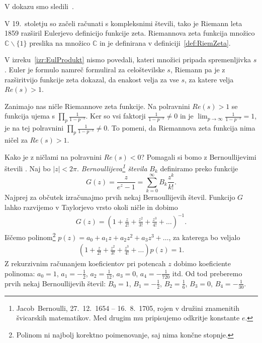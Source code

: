 \documentclass[mat1]{fmfdelo}
\begin{document}
V dokazu smo sledili~\cite{riemannHyp}.

V 19.~stoletju so začeli računati s kompleksnimi števili, tako je Riemann leta 1859 razširil Eulerjevo definicijo funkcije zeta. Riemannova zeta funkcija množico  $\mathbb{C}\backslash\{1\}$ preslika na množico  $\mathbb{C}$ in je definirana v definiciji~\ref{def:RiemZeta}.

\begin{opomba}
V izreku~\ref{izr:EulProdukt} nismo povedali, kateri množici pripada spremenljivka $s$. Euler je formulo namreč formuliral za celoštevilske $s$, Riemann pa je z razširitvijo funkcije zeta dokazal, da enakost velja za vse $s$, za katere velja $Re(s)>1$.
\end{opomba}

Zanimajo nas ničle Riemannove zeta funkcije. Na polravnini $Re(s)>1$ se funkcija ujema s $\prod_{p}\frac{1}{1-p^{-s}}$. Ker so vsi faktorji $\frac{1}{1-p^{-s}} \neq 0$ in je $\lim_{p\to\infty} \frac{1}{1-p^{-s}} = 1$, je na tej polravnini $\prod_{p}\frac{1}{1-p^{-s}} \neq 0$. To pomeni, da Riemannova zeta funkcija nima ničel za $Re(s)>1$.

Kako je z ničlami na polravnini $Re(s)<0$?
Pomagali si bomo z Bernoullijevimi števili \cite[poglavje 3]{bernoulli}. Naj bo $|z|<2\pi$. \emph{Bernoullijeva\footnote{Jacob~Bernoulli, 27.\ 12.\ 1654 -- 16.\ 8.\ 1705, rojen v družini znamenitih švicarskih matematikov. Med drugim mu pripisujemo odkritje konstante $e$.} števila} $B_{k}$ definiramo preko funkcije
\begin{equation}
\label{Eq:Bernoulli}
G(z) = \frac{z}{e^z-1} = \sum_{k=0}^{\infty} B_{k} \frac{z^k}{k!}.
\end{equation}
%
Najprej za občutek izračunajmo prvih nekaj Bernoullijevih števil. Funkcijo $G$ lahko razvijemo v Taylorjevo vrsto okoli ničle in dobimo
\begin{align*}
G(z) = \left(1 + \frac{z}{2!} + \frac{z^2}{3!} + \frac{z^3}{4!} + \ldots \right)^{-1}.
\end{align*}
%
Iščemo polinom\footnote{Polinom ni najbolj korektno poimenovanje, saj nima končne stopnje.} $p(z) = a_{0}+a_{1}z+a_{2}z^2+a_{3}z^3+\dots$, za katerega bo veljalo
\begin{align*}
\left(1 + \frac{z}{2!} + \frac{z^2}{3!} + \frac{z^3}{4!} + \ldots \right) p(z) = 1.
\end{align*}
%
Z rekurzivnim računanjem koeficientov pri potencah $z$ dobimo koeficiente polinoma: $a_{0}=1$, $a_{1}=-\frac{1}{2}$, $a_{2}=\frac{1}{12}$, $a_{3}=0$, $a_{4}=-\frac{1}{720}$ itd. Od tod preberemo prvih nekaj Bernoullijevih števil: $B_{0} = 1$, $B_{1} = -\frac{1}{2}$,  $B_{2} = \frac{1}{6}$,  $B_{3} = 0$, $B_{4} = -\frac{1}{30}$.
\end{document}
